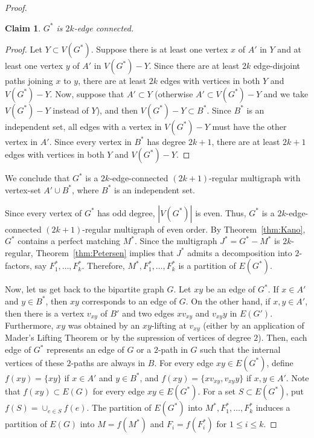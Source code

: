 \documentclass[12pt,reqno,a4paper]{amsart}
\newtheorem{claim}[theorem]{Claim}
\begin{document}
\begin{proof}
\begin{claim}
\(G^*\) is \(2k\)-edge connected.
\end{claim}
\begin{proof}
Let \(Y \subset V(G^*)\).
Suppose there is at least one vertex \(x\) of \(A'\) in \(Y\)
and at least one vertex \(y\) of \(A'\) in \(V(G^*)-Y\).
Since there are at least \(2k\) edge-disjoint paths joining \(x\) to \(y\),
there are at least \(2k\) edges with vertices in both \(Y\) and 
\(V(G^*)-Y\).
Now, suppose that \(A'\subset Y\) (otherwise \(A'\subset V(G^*)-Y\) and
we take \(V(G^*)-Y\) instead of \(Y\)), and then \(V(G^*)-Y \subset B^*\).
Since \(B^*\) is an independent set, all edges with a vertex in \(V(G^*)-Y\) 
must have the other vertex in \(A'\).
Since every vertex in \(B^*\) has degree \(2k+1\), 
there are at least \(2k+1\) edges with vertices in both \(Y\) and \(V(G^*)-Y\). 
\end{proof}

We conclude that $G^*$ is a 
$2k$-edge-connected $(2k+1)$-regular multigraph with vertex-set $A'\cup B^*$, 
where $B^*$ is an independent set.

Since every vertex of \(G^*\) has odd degree, $|V(G^*)|$ is even.
Thus, \(G^*\) is a \(2k\)-edge-connected 
\((2k+1)\)-regular multigraph of even order. 
By Theorem~\ref{thm:Kano}, \(G^*\) contains a perfect matching \(M^*\).
Since the multigraph \(J^* = G^* - M^*\)  
is \(2k\)-regular, Theorem~\ref{thm:Petersen} implies that \(J^*\) admits a decomposition 
into \(2\)-factors, say \(F^*_1,\ldots,F^*_k\).
Therefore, \(M^*,F^*_1,\ldots,F^*_k\) is a partition of \(E(G^*)\).


Now, let us get back to the bipartite graph $G$. 
Let \(xy\) be an edge of \(G^*\).
If $x\in A'$ and $y\in B^*$, 
then \(xy\) corresponds to an edge of \(G\). On the other hand, if \(x,y\in A'\),
then there is a vertex \(v_{xy}\) of \(B'\) and two edges 
\(xv_{xy}\) and \(v_{xy}y\) in $E(G')$. Furthermore,
\(xy\) was obtained by an \(xy\)-lifting 
at \(v_{xy}\) (either by an application of Mader's Lifting 
Theorem or by the supression of vertices of degree $2$).
Then, each edge of \(G^*\) represents an edge of \(G\) or a \(2\)-path
in \(G\) such that the internal vertices of these \(2\)-paths are 
always 
in \(B\).
For every edge $xy\in E(G^*)$, define \(f(xy) = \{xy\}\) if $x\in A'$ and $y\in B^*$,
and \(f(xy) = \{xv_{xy},v_{xy}y\}\) if \(x,y\in A'\). Note that $f(xy)\subset E(G)$ for every edge $xy\in E(G^*)$.
For a set \(S\subset E(G^*)\), put \(f(S) = \cup_{e\in S} f(e)\).
The partition of \(E(G^*)\) into \(M^*,F^*_1,\ldots,F^*_k\) induces 
a partition of \(E(G)\) into \(M = f(M^*)\) and \(F_i = f(F^*_i)\) for $1\leq i\leq k$.



\end{proof}
\end{document}
